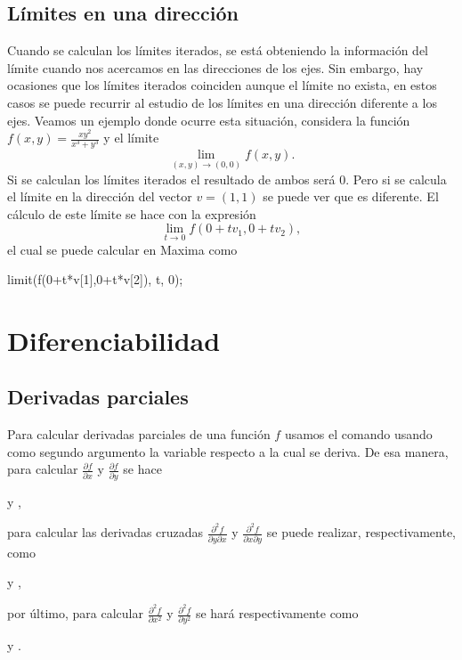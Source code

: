 \subsection{Límites en una dirección}

Cuando se calculan los límites iterados, se está obteniendo
la información del límite cuando nos acercamos en las direcciones
de los ejes.
Sin embargo, hay ocasiones que los límites iterados coinciden
aunque el límite no exista, en estos casos se puede recurrir
al estudio de los límites en una dirección diferente a los ejes.
Veamos un ejemplo donde ocurre esta situación,
considera la función $f(x,y) = \frac{xy^2}{x^3+y^3}$ y el límite
\begin{equation*}
 \lim_{(x,y)\to(0,0)} f(x,y).
\end{equation*}
Si se calculan los límites iterados el resultado de ambos será $0$.
Pero si se calcula el límite en la dirección del vector $v=(1,1)$
se puede ver que es diferente. El cálculo de este límite se hace con
la expresión
\begin{equation*}
 \lim_{t\to0} f(0 + t v_1, 0 + t v_2),
\end{equation*}
el cual se puede calcular en Maxima como
\begin{maximal}
 limit(f(0+t*v[1],0+t*v[2]), t, 0);
\end{maximal}
\begin{maximao}
\end{maximao}


\section{Diferenciabilidad}

\subsection{Derivadas parciales}
Para calcular derivadas parciales de una función $f$
usamos el comando  usando como segundo
argumento la variable respecto a la cual se deriva.
De esa manera, para calcular
$$
y
$$
se hace
\begin{center}
 \quad y \quad
 ,
\end{center}
para calcular las derivadas cruzadas
$$
y
$$
se puede realizar, respectivamente, como
\begin{center}
 \quad y \quad
 ,
\end{center}
por último, para calcular
$$
y
$$
se hará respectivamente como
\begin{center}
 \quad y \quad
 .
\end{center}

